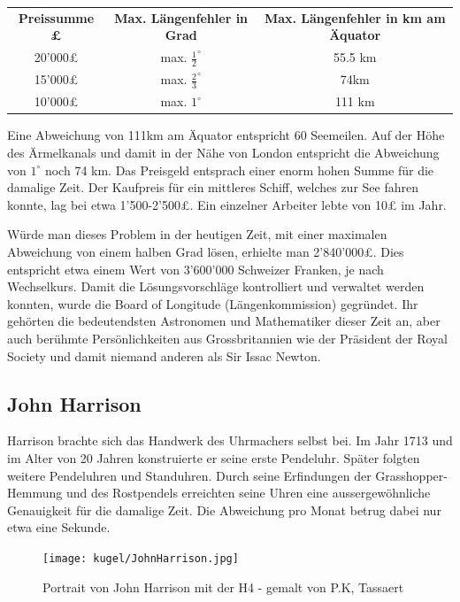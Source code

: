 \begin{refsection}
\begin{center}
\renewcommand{\arraystretch}{2}
\begin{tabular}{ccc}
\textbf{Preissumme £} & \textbf{Max. Längenfehler in Grad} & \textbf{Max. Längenfehler in km am Äquator}  \\
20’000£ & max. $\frac{1}{2}^{\circ}$ & 55.5 km \\
15’000£ & max. $\frac{2}{3}^{\circ}$ & 74km \\
10’000£ & max. $1 ^{\circ}$ & 111 km 
\end{tabular}
\end{center}

Eine Abweichung von 111km am Äquator entspricht 60 Seemeilen.
Auf der Höhe des Ärmelkanals und damit in der Nähe von London entspricht die Abweichung von $1 ^{\circ}$ noch 74 km.
Das Preisgeld entsprach einer enorm hohen Summe für die damalige Zeit. Der Kaufpreis für ein mittleres Schiff, welches zur See fahren konnte, lag bei etwa 1’500-2’500£. Ein einzelner Arbeiter lebte von 10£ im Jahr.

Würde man dieses Problem in der heutigen Zeit, mit einer maximalen Abweichung von einem halben Grad lösen, erhielte man 2’840’000£. Dies entspricht etwa einem Wert von 3’600’000 Schweizer Franken, je nach Wechselkurs.
Damit die Lösungsvorschläge kontrolliert und verwaltet werden konnten, wurde die Board of Longitude (Längenkommission) gegründet. Ihr gehörten die bedeutendsten Astronomen und Mathematiker dieser Zeit an, aber auch berühmte Persönlichkeiten aus Grossbritannien wie der Präsident der Royal Society und damit niemand anderen als Sir Issac Newton.



\subsection{John Harrison}
Harrison brachte sich das Handwerk des Uhrmachers selbst bei. Im Jahr 1713 und im Alter von 20 Jahren konstruierte er seine erste Pendeluhr. Später folgten weitere Pendeluhren und Standuhren. Durch seine Erfindungen der Grasshopper-Hemmung und des Rostpendels erreichten seine Uhren eine aussergewöhnliche Genauigkeit für die damalige Zeit. Die Abweichung pro Monat betrug dabei nur etwa eine Sekunde.

\begin{figure}[htbp]
\centering
\texttt{[image: kugel/JohnHarrison.jpg]}
\caption{Portrait von John Harrison mit der H4 - gemalt von P.K, Tassaert}
\end{figure}


\end{refsection}
